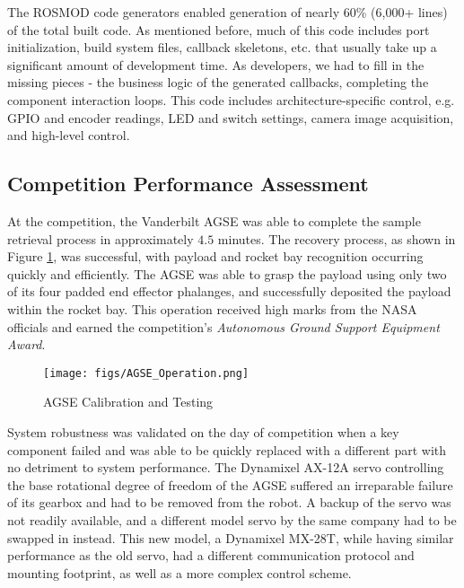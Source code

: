 The ROSMOD code generators enabled generation of nearly 60\% (6,000+ lines) of the total built code. As mentioned before, much of this code includes port initialization, build system files, callback skeletons, etc. that usually take up a significant amount of development time. As developers, we had to fill in the missing pieces - the business logic of the generated callbacks, completing the component interaction loops. This code includes architecture-specific control, e.g. GPIO and encoder readings, LED and switch settings, camera image acquisition, and high-level control.  




\subsection{Competition Performance Assessment}

At the competition, the Vanderbilt AGSE was able to complete the sample retrieval process in approximately $4.5$ minutes. The recovery process, as shown in Figure \ref{fig:AGSE_Operation}, was successful, with payload and rocket bay recognition occurring quickly and efficiently. The AGSE was able to grasp the payload using only two of its four padded end effector phalanges, and successfully deposited the payload within the rocket bay. This operation received high marks from the NASA officials and earned the competition's \emph{Autonomous Ground Support Equipment Award}.

\begin{figure}[t]
	\centering	
	\texttt{[image: figs/AGSE\_Operation.png]}
	\caption{AGSE Calibration and Testing}
	\label{fig:AGSE_Operation}	
\end{figure}

System robustness was validated on the day of competition when a key component failed and was able to be quickly replaced with a different part with no detriment to system performance. The Dynamixel AX-12A servo controlling the base rotational degree of freedom of the AGSE suffered an irreparable failure of its gearbox and had to be removed from the robot. A backup of the servo was not readily available, and a different model servo by the same company had to be swapped in instead.  This new model, a Dynamixel MX-28T, while having similar performance as the old servo, had a different communication protocol and mounting footprint, as well as a more complex control scheme.

